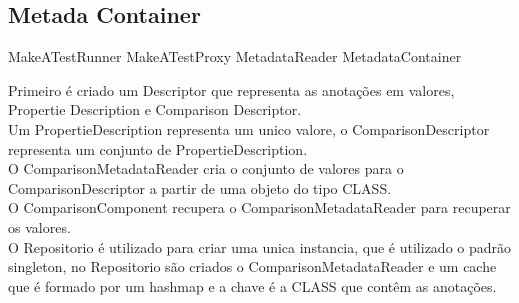 \documentclass{abnt}
\begin{document}
\subsection{Metada Container}
MakeATestRunner
MakeATestProxy
MetadataReader
MetadataContainer


Primeiro é criado um Descriptor que representa as anotações em valores, Propertie Description e Comparison Descriptor.\\
Um PropertieDescription representa um unico valore, o ComparisonDescriptor representa um conjunto de PropertieDescription.\\

O ComparisonMetadataReader cria o conjunto de valores para o ComparisonDescriptor a partir de uma objeto do tipo CLASS.\\

O ComparisonComponent recupera o ComparisonMetadataReader para recuperar os valores.\\

O Repositorio é utilizado para criar uma unica instancia, que é utilizado o padrão singleton, no Repositorio são criados o ComparisonMetadataReader e um cache que é formado por um hashmap e a chave é a CLASS que contêm as anotações.



\end{document}
